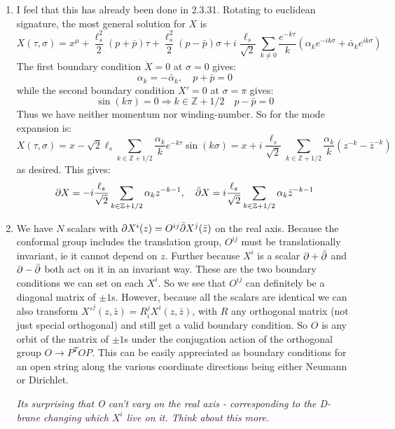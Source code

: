 \documentclass[11pt]{article}
\begin{document}
\begin{enumerate}
	\item I feel that this has already been done in 2.3.31. Rotating to euclidean signature, the most general solution for $X$ is 
	\[
		X(\tau, \sigma) = x^\mu + \frac{\ell_s^2}{2} (p + \bar p) \tau + \frac{\ell_s^2}{2} (p - \bar p) \sigma + i \frac{\ell_s}{\sqrt 2} \sum_{k \neq 0} \frac{e^{-k \tau}}{k} (\alpha_k e^{-i k \sigma} + \bar \alpha_k e^{i k \sigma})
	\]
	The first boundary condition $\dot X = 0$ at $\sigma = 0$ gives:
	\[
		\alpha_k = -\bar \alpha_{k}, \quad p + \bar p = 0
	\]
	while the second boundary condition $X' = 0$ at $\sigma = \pi$ gives:
	\[
		\sin(k \pi) = 0 \Rightarrow k \in \mathbb Z + 1/2 \quad p - \bar p = 0
	\]
	Thus we have neither momentum nor winding-number. So for the mode expansion is:
	\[
		X(\tau, \sigma) = x - \sqrt{2} \ell_s \sum_{k \in \mathbb Z + 1/2} \frac{\alpha_k}{k} e^{-k \tau} \sin(k \sigma) = x + i \frac{\ell_s}{\sqrt 2} \sum_{k \in \mathbb Z + 1/2} \frac{\alpha_k}{k} (z^{-k} - \bar z^{-k})
	\]
	as desired. This gives:
	\[
		\partial X = -i \frac{\ell_s}{\sqrt 2} \sum_{k \in \mathbb Z + 1/2} \alpha_k z^{-k-1}, \quad \bar {\partial} X = i \frac{\ell_s}{\sqrt 2} \sum_{k \in \mathbb Z + 1/2} \alpha_k \bar z^{-k-1}
	\]
	\item 
	We have $N$ scalars with $\partial X^i (z) = O^{ij} \bar {\partial} X^j(\bar z)$ on the real axis. Because the conformal group includes the translation group, $O^{ij}$ must be translationally invariant, ie it cannot depend on $z$. Further because $X^i$ is a scalar $\partial + \bar {\partial}$ and $\partial - \bar {\partial}$ both act on it in an invariant way. These are the two boundary conditions we can set on each $X^i$. So we see that $O^{ij}$ can definitely be a diagonal matrix of $\pm 1$s. However, because all the scalars are identical we can also transform ${X'}^j(z, \bar z) = R^j_i X^i(z ,\bar z)$, with $R$ any orthogonal matrix (not just special orthogonal) and still get a valid boundary condition. So $O$ is any orbit of the matrix of $\pm 1$s under the conjugation action of the orthogonal group $O \to P^T O P$. This can be easily appreciated as boundary conditions for an open string along the various coordinate directions being either Neumann or Dirichlet. 
	
	\emph{Its surprising that O can't vary on the real axis - corresponding to the D-brane changing which $X^i$ live on it. Think about this more.}
	 

\end{enumerate}
\end{document}
